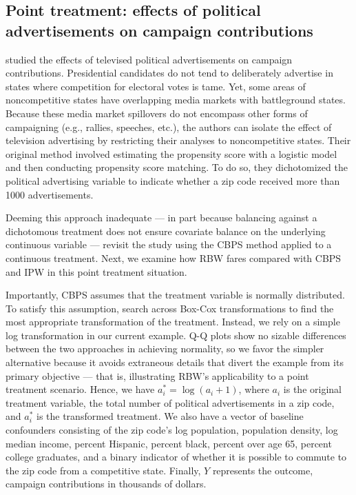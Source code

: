 \hypertarget{point-treatment-example}{%
\subsection{Point treatment: effects of political advertisements on
campaign contributions}\label{point-treatment-example}}

\citet{urbanDollarsSidewalkShould2014a} studied the effects of televised
political advertisements on campaign contributions. Presidential
candidates do not tend to deliberately advertise in states where
competition for electoral votes is tame. Yet, some areas of
noncompetitive states have overlapping media markets with battleground
states. Because these media market spillovers do not encompass other
forms of campaigning (e.g., rallies, speeches, etc.), the authors can
isolate the effect of television advertising by restricting their
analyses to noncompetitive states. Their original method involved
estimating the propensity score with a logistic model and then
conducting propensity score matching. To do so, they dichotomized the
political advertising variable to indicate whether a zip code received
more than 1000 advertisements.

Deeming this approach inadequate --- in part because balancing against a
dichotomous treatment does not ensure covariate balance on the
underlying continuous variable ---
\citet{fongCovariateBalancingPropensity2018} revisit the study using the
CBPS method applied to a continuous treatment. Next, we examine how RBW
fares compared with CBPS and IPW in this point treatment situation.

Importantly, CBPS assumes that the treatment variable is normally
distributed. To satisfy this assumption,
\citet{fongCovariateBalancingPropensity2018} search across Box-Cox
transformations to find the most appropriate transformation of the
treatment. Instead, we rely on a simple log transformation in our
current example. Q-Q plots show no sizable differences between the two
approaches in achieving normality, so we favor the simpler alternative
because it avoids extraneous details that divert the example from its
primary objective --- that is, illustrating RBW's applicability to a
point treatment scenario. Hence, we have \(a_{i}^{*}=\log(a_{i}+1)\),
where \(a_{i}\) is the original treatment variable, the total number of
political advertisements in a zip code, and \(a_{i}^{*}\) is the
transformed treatment. We also have a vector of baseline confounders
consisting of the zip code's log population, population density, log
median income, percent Hispanic, percent black, percent over age 65,
percent college graduates, and a binary indicator of whether it is
possible to commute to the zip code from a competitive state. Finally,
\(Y\) represents the outcome, campaign contributions in thousands of
dollars.

